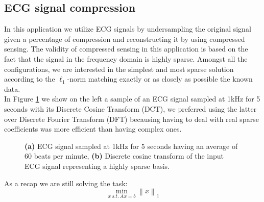 \documentclass[journal,article,submit,electronics,pdftex]{Definitions/mdpi}
\newcommand{\norm}[1]{\left\lVert#1\right\rVert}
\begin{document}
\subsection{ECG signal compression}\label{sec:ecg_signal}
In this application we utilize ECG signals by undersampling the original signal given a percentage of compression and reconstructing it by using compressed sensing. The validity of compressed sensing in this application is based on the fact that the signal in the frequency domain is highly sparse. Amongst all the configurations, we are interested in the simplest and most sparse solution according to the $\ell_1$-norm matching exactly or as closely as possible the known data.\\
In Figure \ref{fig:ecg_dft} we show  on the left a sample of an ECG signal sampled at 1kHz for 5 seconds with its Discrete Cosine Transform (DCT), we preferred using the latter over Discrete Fourier Transform (DFT) becausing having to deal with real sparse coefficients was more efficient than having complex ones.

\begin{figure}[H]
\centering
{}
\caption{\textbf{(a)} ECG signal sampled at 1kHz for 5 seconds having an average of 60 beats per minute, \textbf{(b)} Discrete cosine transform of the input ECG signal representing a highly sparse basis.}
\label{fig:ecg_dft}
\end{figure}

As a recap we are still solving the task:
\begin{equation}
\min\limits_{x\:s.t.\:Ax = b}\norm{x}_1
\end{equation}
\end{document}
